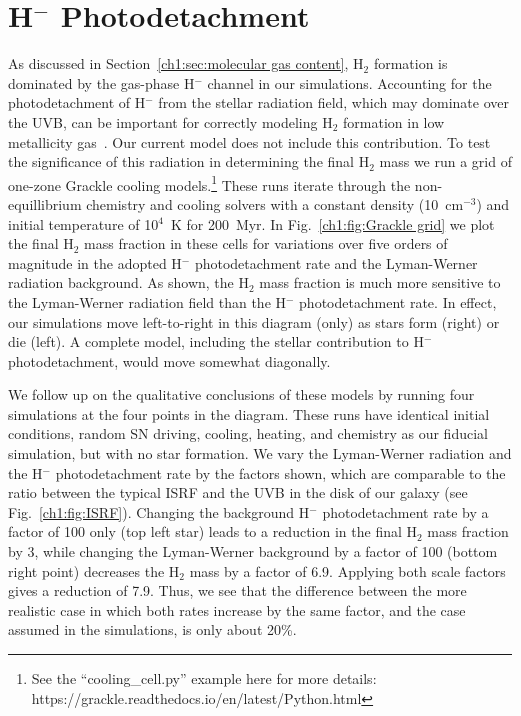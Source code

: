 \setcounter{figure}{0}
\section{H$^{-}$ Photodetachment}
\label{appendix:H minus}

As discussed in Section~\ref{ch1:sec:molecular gas content}, H$_2$ formation is dominated by the gas-phase H$^{-}$ channel in our simulations. Accounting for the photodetachment of H$^{-}$ from the stellar radiation field, which may dominate over the UVB, can be important for correctly modeling H$_2$ formation in low metallicity gas~\citep{Wolcott-Green2012}. Our current model does not include this contribution. To test the significance of this radiation in determining the final H$_2$ mass we run a grid of one-zone Grackle cooling models.\footnote{See the ``cooling\_cell.py'' example here for more details: https://grackle.readthedocs.io/en/latest/Python.html}  These runs iterate through the non-equillibrium chemistry and cooling solvers with a constant density (10~cm$^{-3}$) and initial temperature of 10$^{4}$~K for 200~Myr. In Fig.~\ref{ch1:fig:Grackle grid} we plot the final H$_2$ mass fraction in these cells for variations over five orders of magnitude in the adopted H$^{-}$ photodetachment rate and the Lyman-Werner radiation background. As shown, the H$_2$ mass fraction is much more sensitive to the Lyman-Werner radiation field than the H$^-$ photodetachment rate. In effect, our simulations move left-to-right in this diagram (only) as stars form (right) or die (left). A complete model, including the stellar contribution to H$^{-}$ photodetachment, would move somewhat diagonally.

We follow up on the qualitative conclusions of these models by running four simulations at the four points in the diagram. These runs have identical initial conditions, random SN driving, cooling, heating, and chemistry as our fiducial simulation, but with no star formation. We vary the Lyman-Werner radiation and the H$^{-}$ photodetachment rate by the factors shown, which are comparable to the ratio between the typical ISRF and the UVB in the disk of our galaxy (see Fig.~\ref{ch1:fig:ISRF}). Changing the background H$^{-}$ photodetachment rate by a factor of 100 only (top left star) leads to a reduction in the final H$_2$ mass fraction by 3, while changing the Lyman-Werner background by a factor of 100 (bottom right point) decreases the H$_2$ mass by a factor of 6.9. Applying both scale factors gives a reduction of 7.9. Thus, we see that the difference between the more realistic case in which both rates increase by the same factor, and the case assumed in the simulations, is only about 20\%.

